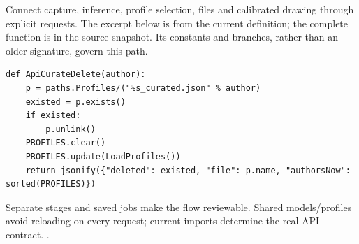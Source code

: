 Connect capture, inference, profile selection, files and calibrated drawing through explicit requests. The excerpt below is from the current definition; the complete function is in the source snapshot. Its constants and branches, rather than an older signature, govern this path.


\begin{lstlisting}[style=plain]
def ApiCurateDelete(author):
    p = paths.Profiles/("%s_curated.json" % author)
    existed = p.exists()
    if existed:
        p.unlink()
    PROFILES.clear()
    PROFILES.update(LoadProfiles())
    return jsonify({"deleted": existed, "file": p.name, "authorsNow": sorted(PROFILES)})
\end{lstlisting}
Separate stages and saved jobs make the flow reviewable. Shared models/profiles avoid reloading on every request; current imports determine the real API contract. \cite{flaskdocs,pillowops,code2026}.

